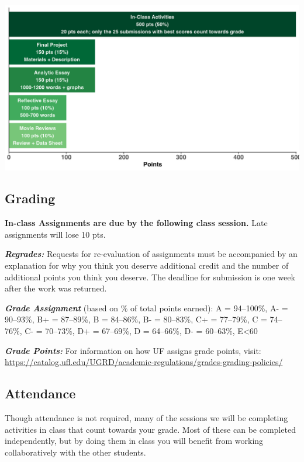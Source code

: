 \documentclass[
  10pt,
  letterpaper,
  oneside,
  open=any]{scrbook}
\begin{document}
\begin{center}
\includegraphics[width=1\linewidth,height=\textheight,keepaspectratio]{images/hw.png}
\end{center}

\subsection*{Grading}\label{grading}

\textbf{In-class Assignments are due by the following class session.}
Late assignments will lose 10 pts.

\textbf{\emph{Regrades:}} Requests for re-evaluation of assignments must
be accompanied by an explanation for why you think you deserve
additional credit and the number of additional points you think you
deserve. The deadline for submission is one week after the work was
returned.

\textbf{\emph{Grade Assignment}} (based on \% of total points earned): A
= 94--100\%, A- = 90--93\%, B+ = 87--89\%, B = 84--86\%, B- = 80--83\%,
C+ = 77--79\%, C = 74--76\%, C- = 70--73\%, D+ = 67--69\%, D = 64--66\%,
D- = 60--63\%, E\textless60

\textbf{\emph{Grade Points:}} For information on how UF assigns grade
points, visit:
\url{https://catalog.ufl.edu/UGRD/academic-regulations/grades-grading-policies/}

\subsection*{Attendance}\label{attendance}

Though attendance is not required, many of the sessions we will be
completing activities in class that count towards your grade. Most of
these can be completed independently, but by doing them in class you
will benefit from working collaboratively with the other students.
\end{document}
